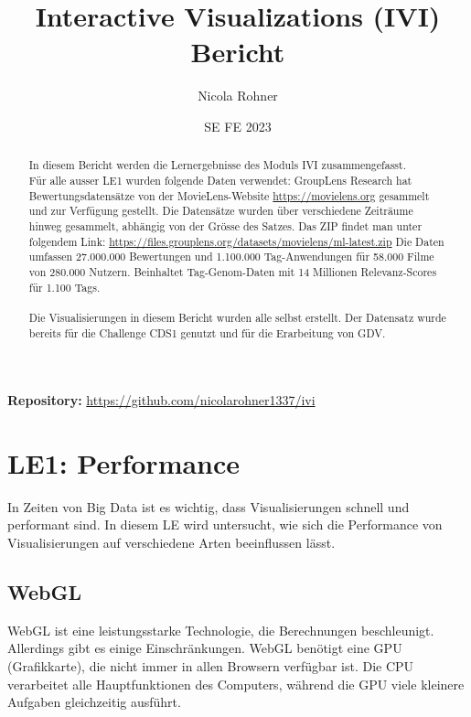 \documentclass{article}
\title{Interactive Visualizations (IVI) Bericht}
\author{Nicola Rohner}
\date{SE FE 2023}
\begin{document}
\maketitle

\begin{center}
\textbf{Repository:} \url{https://github.com/nicolarohner1337/ivi}
\end{center}

\begin{abstract}
In diesem Bericht werden die Lernergebnisse des Moduls IVI zusammengefasst.\\
Für alle ausser LE1 wurden folgende Daten verwendet: \newline
GroupLens Research hat Bewertungsdatensätze von der MovieLens-Website \url{https://movielens.org} gesammelt und zur Verfügung gestellt.
Die Datensätze wurden über verschiedene Zeiträume hinweg gesammelt, abhängig von der Grösse des Satzes. Das ZIP findet man unter folgendem Link: \url{https://files.grouplens.org/datasets/movielens/ml-latest.zip}
Die Daten umfassen 27.000.000 Bewertungen und 1.100.000 Tag-Anwendungen für 58.000 Filme von 280.000 Nutzern. Beinhaltet Tag-Genom-Daten mit 14 Millionen Relevanz-Scores für 1.100 Tags.\\
\noindent\\
Die Visualisierungen in diesem Bericht wurden alle selbst erstellt. 
Der Datensatz wurde bereits für die Challenge CDS1 genutzt und für die Erarbeitung von GDV.
\end{abstract}

\tableofcontents

\newpage

\section{LE1: Performance}
In Zeiten von Big Data ist es wichtig, dass Visualisierungen schnell und performant sind. In diesem LE wird untersucht, wie sich die Performance von Visualisierungen auf verschiedene Arten beeinflussen lässt.


\subsection{WebGL}
WebGL ist eine leistungsstarke Technologie, die Berechnungen beschleunigt. Allerdings gibt es einige Einschränkungen.
WebGL benötigt eine GPU (Grafikkarte), die nicht immer in allen Browsern verfügbar ist.
Die CPU verarbeitet alle Hauptfunktionen des Computers, während die GPU viele kleinere Aufgaben gleichzeitig ausführt.\cite{noauthor_cpu_nodate}
\end{document}
